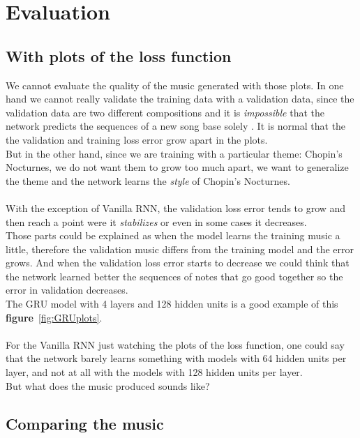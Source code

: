 \documentclass[11pt]
{article}
\begin{document}
\section{Evaluation}

\subsection{With plots of the loss function}
We cannot evaluate the quality of the music generated with those plots.
In one hand we cannot really validate the training data with a validation data, since the validation data are two different compositions and it is \textit{impossible} that the network predicts the sequences of a new song base solely .
It is normal that the the validation and training loss error grow apart in the plots.\\
But in the other hand, since we are training with a particular theme: Chopin's Nocturnes, we do not want them to grow too much apart, we want to generalize the theme and the network learns the \textit{style} of Chopin's Nocturnes.\\
\\

With the exception of Vanilla RNN, the validation loss error tends to grow and then reach a point were it \textit{stabilizes} or even in some cases it decreases.\\
Those parts could be explained as when the model learns the training music a little, therefore the validation music differs from the training model and the error grows.
And when the validation loss error starts to decrease we could think that the network learned better the sequences of notes that go good together so the error in validation decreases.\\
The GRU model with 4 layers and 128 hidden units is a good example of this \textbf{figure}~\ref{fig:GRUplots}.\\
\\
For the Vanilla RNN just watching the plots of the loss function, one could say that the network barely learns something with models with 64 hidden units per layer, and not at all with the models with 128 hidden units per layer.\\
But what does the music produced sounds like?







\subsection{Comparing the music}
\end{document}
